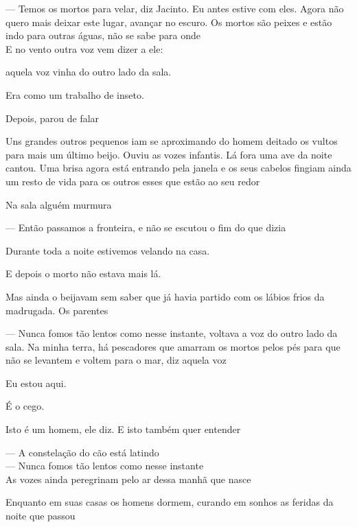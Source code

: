 --- Temos os mortos para velar, diz Jacinto. Eu antes estive com eles.
Agora não quero mais deixar este lugar, avançar no escuro. Os mortos são
peixes e estão indo para outras águas, não se sabe para onde\\

E no vento outra voz vem dizer a ele:

\bigskip
\bigskip
\bigskip
\bigskip

aquela voz vinha do outro lado da sala.

Era como um trabalho de inseto.

Depois, parou de falar

Uns grandes outros pequenos iam se aproximando do homem deitado os
vultos para mais um último beijo. Ouviu as vozes infantis. Lá fora uma
ave da noite cantou. Uma brisa agora está entrando pela janela e os seus
cabelos fingiam ainda um resto de vida para os outros esses que estão ao
seu redor

Na sala alguém murmura

--- Então passamos a fronteira, e não se escutou o fim do que dizia

Durante toda a noite estivemos velando na casa.

E depois o morto não estava mais lá.

Mas ainda o beijavam sem saber que já havia partido com os lábios frios
da madrugada. Os parentes

--- Nunca fomos tão lentos como nesse instante, voltava a voz do outro
lado da sala. Na minha terra, há pescadores que amarram os mortos pelos
pés para que não se levantem e voltem para o mar, diz aquela voz

\pagebreak

\vspace*{4cm}

Eu estou aqui.

É o cego.

Isto é um homem, ele diz. E isto também quer entender

\pagebreak

\vspace*{4cm}

--- A constelação do cão está latindo\\

--- Nunca fomos tão lentos como nesse instante\\

As vozes ainda peregrinam pelo ar dessa manhã que nasce

Enquanto em suas casas os homens dormem, curando em sonhos as feridas da
noite que passou\\

